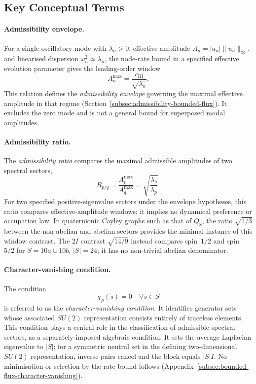 \subsection{Key Conceptual Terms}
  \label{subsec:key-conceptual-terms}

  \paragraph{Admissibility envelope.}
    For a single oscillatory mode with $\lambda_n>0$, effective amplitude
    $A_n=|a_n|\|u_n\|_\infty$, and linearised dispersion $\omega_n^2\simeq\lambda_n$,
    the node-rate bound in a specified effective evolution parameter gives the leading-order window
    \[
      A_n^{\max} = \frac{c_{\mathrm{BI}}}{\sqrt{\lambda_n}}.
    \]
    This relation defines the \emph{admissibility envelope} governing the maximal
    effective amplitude in that regime (Section~\ref{subsec:admissibility-bounded-flux}).
    It excludes the zero mode and is not a general bound for superposed modal amplitudes.

  \paragraph{Admissibility ratio.}
    The \emph{admissibility ratio} compares the maximal admissible amplitudes of two
    spectral sectors,
    \[
      R_{p/q} = \frac{A_p^{\max}}{A_q^{\max}}
      = \sqrt{\frac{\lambda_q}{\lambda_p}} .
    \]
    For two specified positive-eigenvalue sectors under the envelope hypotheses, this ratio compares
    effective-amplitude windows; it implies no dynamical preference or occupation law.
    In quaternionic Cayley graphs such as that of $Q_8$, the ratio
    $\sqrt{4/3}$ between the non-abelian and abelian sectors provides the minimal
    instance of this window contrast.
    The $2I$ contrast $\sqrt{14/9}$ instead compares spin~$1/2$ and spin~$5/2$ for
    $S=10a\cup10b$, $|S|=24$; it has no non-trivial abelian denominator.

  \paragraph{Character-vanishing condition.}
    The condition
    \[
      \chi_\rho(s) = 0 \quad \forall s \in S
    \]
    is referred to as the \emph{character-vanishing condition}.
    It identifies generator sets whose associated $SU(2)$ representation consists entirely
    of traceless elements.
    This condition plays a central role in the classification of admissible spectral sectors,
    as a separately imposed algebraic condition.
    It sets the average Laplacian eigenvalue to $|S|$; for a symmetric neutral set in the defining
    two-dimensional $SU(2)$ representation, inverse pairs cancel and the block equals $|S|I$.
    No minimisation or selection by the rate bound follows (Appendix~\ref{subsec:bounded-flux-character-vanishing}).

